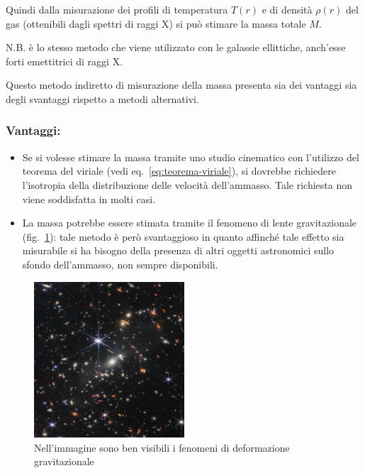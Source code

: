 Quindi dalla misurazione dei profili di temperatura $T(r)$ e di densità $\rho(r)$ del gas (ottenibili dagli spettri di raggi X) si può stimare la massa totale $M$. 

\noindent N.B. è lo stesso metodo che viene utilizzato con le galassie ellittiche, anch’esse forti emettitrici di raggi X.

Questo metodo indiretto di misurazione della massa presenta sia dei vantaggi sia degli svantaggi rispetto a metodi alternativi.

\subsubsection{\textbf{Vantaggi:}} 
\begin{itemize}
    \item Se si volesse stimare la massa tramite uno studio cinematico con l'utilizzo del teorema del viriale (vedi eq.~\ref{eq:teorema-viriale}), si dovrebbe richiedere l'isotropia della distribuzione delle velocità dell'ammasso. Tale richiesta non viene soddisfatta in molti casi. 
    \item La massa potrebbe essere stimata tramite il fenomeno di lente gravitazionale (fig.~\ref{fig:lensing}): tale metodo è però svantaggioso in quanto affinché tale effetto sia misurabile si ha bisogno della presenza di altri oggetti astronomici sullo sfondo dell’ammasso, non sempre disponibili.
\end{itemize} 

\begin{figure}
    \centering
    \includegraphics[width = 0.5\textwidth]{immagini/lensing.jpg}
    \caption{Nell'immagine sono ben visibili i fenomeni di deformazione gravitazionale}
    \label{fig:lensing}
\end{figure}


